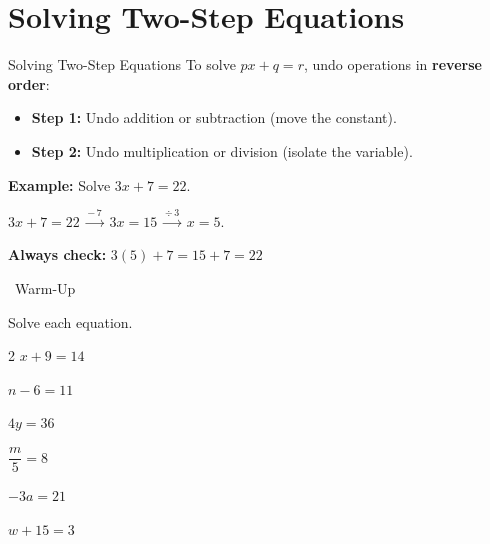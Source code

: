 \section{Solving Two-Step Equations}

\begin{quickReview}{Solving Two-Step Equations}
To solve $px + q = r$, undo operations in \textbf{reverse order}:
\begin{itemize}[leftmargin=*]
    \item \textbf{Step 1:} Undo addition or subtraction (move the constant).
    \item \textbf{Step 2:} Undo multiplication or division (isolate the variable).
\end{itemize}

\medskip
\textbf{Example:} Solve $3x + 7 = 22$.

$3x + 7 = 22 \;\xrightarrow{-\,7}\; 3x = 15 \;\xrightarrow{\div\,3}\; x = 5$.

\smallskip
\textbf{Always check:} $3(5) + 7 = 15 + 7 = 22$ \checkmark
\end{quickReview}

\begin{practiceBox}[funGreen]{\faSun~Warm-Up}

Solve each equation.

\begin{multicols}{2}
\prob $x + 9 = 14$ \answerBlank[2.5cm]

\prob $n - 6 = 11$ \answerBlank[2.5cm]

\prob $4y = 36$ \answerBlank[2.5cm]

\prob $\dfrac{m}{5} = 8$ \answerBlank[2.5cm]

\prob $-3a = 21$ \answerBlank[2.5cm]

\prob $w + 15 = 3$ \answerBlank[2.5cm]
\end{multicols}
\end{practiceBox}

